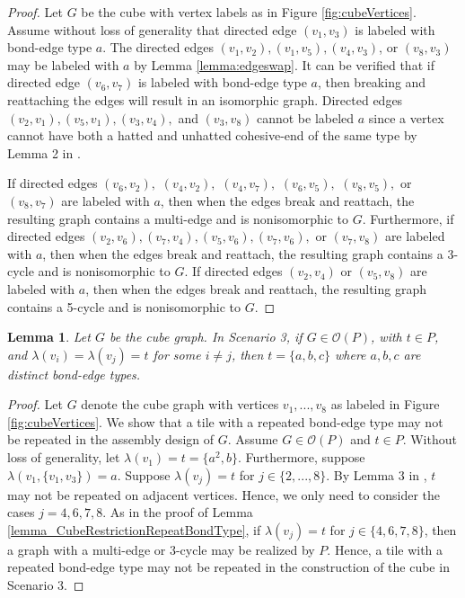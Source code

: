 \documentclass{elsarticle}
\newtheorem{lemma}[theorem]{Lemma}
\theoremstyle{definition}
\theoremstyle{remark}
\theoremstyle{plain}
\theoremstyle{plain}
\begin{document}
\begin{proof}
 Let $G$ be the cube with vertex labels as in Figure \ref{fig:cubeVertices}. Assume without loss of generality that directed edge $(v_1, v_3)$ is labeled with bond-edge type $a$.  The directed edges $(v_1,v_2), (v_1, v_5), (v_4,v_3)$, or $(v_8, v_3)$ may be labeled with $a$  by Lemma \ref{lemma:edgeswap}. It can be verified that if directed edge $(v_6, v_7)$ is labeled with bond-edge type $a$, then breaking and reattaching the edges will result in an isomorphic graph. Directed edges $(v_2, v_1), (v_5,v_1), (v_3,v_4),$ and $(v_3,v_8)$ cannot be labeled $a$ since a vertex cannot have both a hatted and unhatted cohesive-end of the same type  by Lemma 2 in \cite{ellis2014minimal}. 
 
 If directed edges $(v_6, v_2),$ $(v_4, v_2),$ $(v_4, v_7),$ $(v_6,v_5),$ $(v_8,v_5),$ or $(v_8,v_7)$ are labeled with $a$, then when the edges break and reattach, the resulting graph contains a multi-edge and is nonisomorphic to $G$.  Furthermore, if directed edges $(v_2, v_6), (v_7, v_4), (v_5,v_6),  (v_7, v_6),$  or $(v_7,v_8)$ are labeled with $a$, then when the edges break and reattach, the resulting graph contains a 3-cycle and is nonisomorphic to $G$. If directed edges $(v_2, v_4)$ or $(v_5,v_8)$ are labeled with $a$, then when the edges break and reattach, the resulting graph contains a 5-cycle and is nonisomorphic to $G$.
\end{proof}
  
  

\begin{lemma}\label{lemma2_Cube3bonds}
  Let $G$ be the cube graph. In Scenario 3, if $G \in \mathcal{O}(P)$, with $t \in P$, and $\lambda(v_i) = \lambda(v_j) = t$ for some $i \neq j$, then $t= \{a, b, c\}$ where $a,b,c$ are distinct bond-edge types.
 \end{lemma}
 
 \begin{proof} 
  Let $G$ denote the cube graph with vertices $v_1,...,v_8$ as labeled in Figure \ref{fig:cubeVertices}. We show that a tile with a repeated bond-edge type may not be repeated in the assembly design of $G$.   Assume $G \in \mathcal{O}(P)$ and $t \in P$. Without loss of generality, let $\lambda(v_1)=t=\{a^2,b\}$. Furthermore, suppose $\lambda(v_1,\{v_1,v_3\}) = a$. 
  Suppose $\lambda(v_j) = t$  for $j \in \{2,...,8\}$. By Lemma 3 in \cite{ellis2014minimal}, $t$ may not be repeated on adjacent vertices. Hence, we only need to consider the cases $j=4,6,7, 8$. As in the proof of Lemma \ref{lemma_CubeRestrictionRepeatBondType}, if $\lambda(v_j) = t$ for $j \in \{4, 6, 7, 8\}$, then a graph with a multi-edge or 3-cycle may be realized by $P$.  
  Hence, a tile with a repeated bond-edge type may not be repeated in the construction of the cube in Scenario 3.
 \end{proof}
\end{document}
